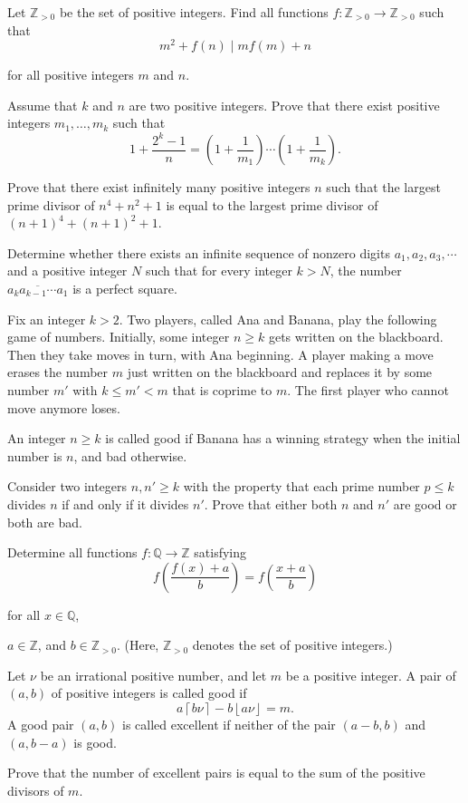 
\item[\textbf{N1.}]
Let 
$\mathbb{Z} _{>0}$
 be the set of positive integers. Find all functions  
$f: \mathbb{Z} _{>0}\rightarrow \mathbb{Z} _{>0}$
 such that
\[ m^2 + f(n) \mid mf(m) +n \]


for all positive integers 
$m$
 and 
$n$.

\item[\textbf{N2.}]
Assume that 
$k$
 and 
$n$
 are two positive integers. Prove that there exist positive integers 
$m_1 , \dots , m_k$
 such that 
\[1+\frac{2^k-1}{n}=\left(1+\frac1{m_1}\right)\cdots \left(1+\frac1{m_k}\right).\]

\item[\textbf{N3.}]
Prove that there exist infinitely many positive integers 
$n$
 such that the largest prime divisor of 
$n^4 + n^2 + 1$
 is equal to the largest prime divisor of 
$(n+1)^4 + (n+1)^2 +1$.

\item[\textbf{N4.}]
Determine whether there exists an infinite sequence of nonzero digits 
$a_1 , a_2 , a_3 , \cdots $
 and a positive integer 
$N$
 such that for every integer 
$k > N$, 
 the number 
$\overline{a_k a_{k-1}\cdots a_1 }$
 is a perfect square.

\item[\textbf{N5.}]
Fix an integer 
$k>2$.
 Two players, called Ana and Banana, play the following game of numbers. Initially, some integer 
$n \ge k$
 gets written on the blackboard. Then they take moves in turn, with Ana beginning. A player making a move erases the number 
$m$
 just written on the blackboard and replaces it by some number 
$m'$
 with 
$k \le m' < m$
 that is coprime to 
$m$.
 The first player who cannot move anymore loses.


An integer 
$n \ge k $
 is called good if Banana has a winning strategy when the initial number is 
$n$, 
 and bad otherwise.


Consider two integers 
$n,n' \ge k$
 with the property that each prime number 
$p \le k$
 divides 
$n$
 if and only if it divides 
$n'$.
 Prove that either both 
$n$
 and 
$n'$
 are good or both are bad.

\item[\textbf{N6.}]
Determine all functions 
$f: \mathbb{Q} \rightarrow \mathbb{Z} $
 satisfying
\[ f \left( \frac{f(x)+a} {b}\right) = f \left( \frac{x+a}{b} \right) \]


for all  
$x \in \mathbb{Q}$, 
 
$a \in \mathbb{Z}$, 
 and 
$b \in \mathbb{Z}_{>0}$.
 (Here, 
$\mathbb{Z}_{>0}$
 denotes the set of positive integers.)

\item[\textbf{N7.}]
Let 
$\nu$
 be an irrational positive number, and let 
$m$
 be a positive integer. A pair of 
$(a,b)$
 of positive integers is called 
good
 if
\[a \left \lceil b\nu \right \rceil - b \left \lfloor a \nu \right \rfloor = m.\]
 A good pair 
$(a,b)$
 is called 
excellent
 if neither of the pair 
$(a-b,b)$
 and 
$(a,b-a)$
 is good.


Prove that the number of excellent pairs is equal to the sum of the positive divisors of 
$m$.